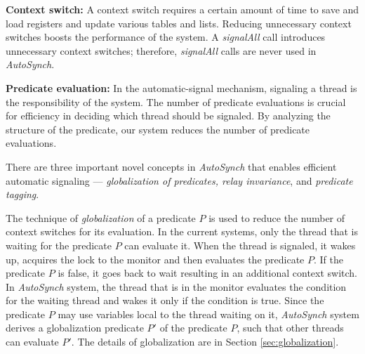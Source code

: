 \documentclass[preprint]{sigplanconf}
\begin{document}
\begin{description}
    \item{\bf Context switch:} A context switch requires a certain 
        amount of time to save and load registers and update various tables and
        lists. Reducing unnecessary context switches boosts the performance of the system.
        A {\em signalAll} call introduces unnecessary context switches; therefore,
        {\em signalAll} calls are never used in {\em AutoSynch}. 
    \item {\bf Predicate evaluation:} In the 
        automatic-signal mechanism, signaling a thread is the 
        responsibility of the system. The number of predicate evaluations is 
        crucial for efficiency in deciding which thread should be signaled. 
        By analyzing the structure of the predicate, our system reduces the number of predicate evaluations.
\end{description}


There are three important novel concepts in {\em AutoSynch} that enables efficient automatic
signaling --- {\em globalization of predicates, relay invariance}, and {\em predicate
tagging}.

The technique of {\em globalization} of a predicate $P$ is used to reduce the number of 
context switches for its evaluation. In the current systems, only the thread that is waiting
for the predicate $P$ can evaluate it. When the thread is signaled, it wakes up, acquires the
lock to the monitor and then evaluates the predicate $P$. If the predicate $P$ is false, it
goes back to wait resulting in an additional context switch. In {\em AutoSynch} system, the thread
that is in the monitor evaluates the condition for the waiting thread and wakes it only
if the condition is true. Since the predicate $P$ may use variables local to the thread
waiting on it, {\em AutoSynch} system derives a globalization predicate $P'$ of
the predicate $P$, such that other threads can evaluate $P'$. 
The details of globalization are in Section \ref{sec:globalization}.

\end{document}
